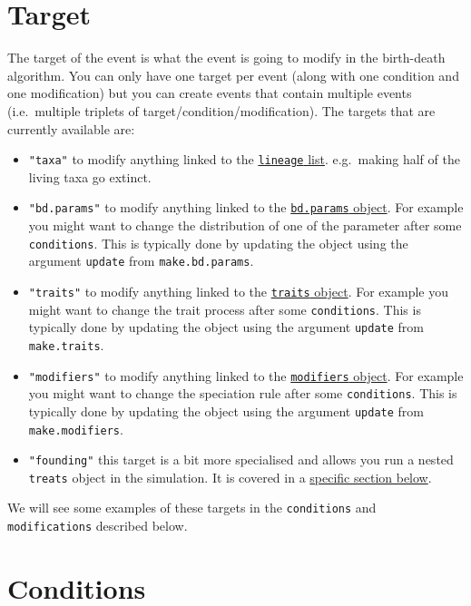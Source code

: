 \documentclass[
]{book}
\providecommand{\tightlist}{%
  \setlength{\itemsep}{0pt}\setlength{\parskip}{0pt}}
\begin{document}
\hypertarget{target}{%
\section{Target}\label{target}}

The target of the event is what the event is going to modify in the birth-death algorithm.
You can only have one target per event (along with one condition and one modification) but you can create events that contain multiple events (i.e.~multiple triplets of target/condition/modification).
The targets that are currently available are:

\begin{itemize}
\tightlist
\item
  \texttt{"taxa"} to modify anything linked to the \protect\hyperlink{allowarguments}{\texttt{lineage} list}. e.g.~making half of the living taxa go extinct.
\item
  \texttt{"bd.params"} to modify anything linked to the \protect\hyperlink{makebdparams}{\texttt{bd.params} object}. For example you might want to change the distribution of one of the parameter after some \texttt{conditions}. This is typically done by updating the object using the argument \texttt{update} from \texttt{make.bd.params}.
\item
  \texttt{"traits"} to modify anything linked to the \protect\hyperlink{maketraits}{\texttt{traits} object}. For example you might want to change the trait process after some \texttt{conditions}. This is typically done by updating the object using the argument \texttt{update} from \texttt{make.traits}.
\item
  \texttt{"modifiers"} to modify anything linked to the \protect\hyperlink{makebdmodifiers}{\texttt{modifiers} object}. For example you might want to change the speciation rule after some \texttt{conditions}. This is typically done by updating the object using the argument \texttt{update} from \texttt{make.modifiers}.
\item
  \texttt{"founding"} this target is a bit more specialised and allows you run a nested \texttt{treats} object in the simulation. It is covered in a \protect\hyperlink{founding}{specific section below}.
\end{itemize}

We will see some examples of these targets in the \texttt{conditions} and \texttt{modifications} described below.

\hypertarget{conditions}{%
\section{Conditions}\label{conditions}}
\end{document}

